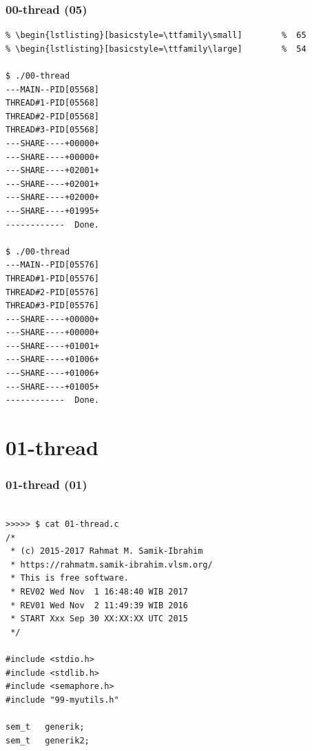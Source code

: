 \documentclass[xcolor=table, notheorems, hyperref={pdfpagelabels=false}]{beamer}
\begin{document}
\begin{frame}[fragile]
\frametitle{00-thread (05)}
\begin{lstlisting}[basicstyle=\ttfamily\tiny]         % 108
% \begin{lstlisting}[basicstyle=\ttfamily\footnotesize] %  72
% \begin{lstlisting}[basicstyle=\ttfamily\small]        %  65
% \begin{lstlisting}[basicstyle=\ttfamily\large]        %  54

$ ./00-thread 
---MAIN--PID[05568]
THREAD#1-PID[05568]
THREAD#2-PID[05568]
THREAD#3-PID[05568]
---SHARE----+00000+
---SHARE----+00000+
---SHARE----+02001+
---SHARE----+02001+
---SHARE----+02000+
---SHARE----+01995+
------------  Done.

$ ./00-thread 
---MAIN--PID[05576]
THREAD#1-PID[05576]
THREAD#2-PID[05576]
THREAD#3-PID[05576]
---SHARE----+00000+
---SHARE----+00000+
---SHARE----+01001+
---SHARE----+01006+
---SHARE----+01006+
---SHARE----+01005+
------------  Done.

\end{lstlisting}
\end{frame}

\section{01-thread}
\begin{frame}[fragile]
\frametitle{01-thread (01)}
\begin{lstlisting}[basicstyle=\ttfamily\footnotesize]

>>>>> $ cat 01-thread.c
/*
 * (c) 2015-2017 Rahmat M. Samik-Ibrahim
 * https://rahmatm.samik-ibrahim.vlsm.org/
 * This is free software.
 * REV02 Wed Nov  1 16:48:40 WIB 2017
 * REV01 Wed Nov  2 11:49:39 WIB 2016
 * START Xxx Sep 30 XX:XX:XX UTC 2015
 */

#include <stdio.h>
#include <stdlib.h>
#include <semaphore.h>
#include "99-myutils.h"

sem_t	generik;
sem_t	generik2;

\end{lstlisting}
\end{frame}
\end{document}
